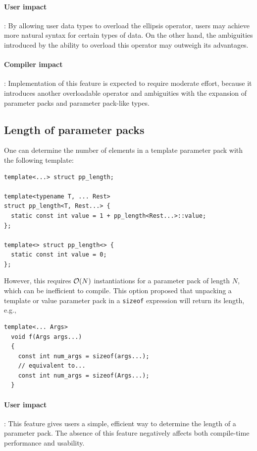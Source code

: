 \documentclass{article}
\begin{document}
\paragraph{User impact}: By allowing user data types to overload the
ellipsis operator, users may achieve more natural syntax for certain
types of data. On the other hand, the ambiguities introduced by the
ability to overload this operator may outweigh its advantages.

\paragraph{Compiler impact}: Implementation of this feature is expected to
require moderate effort, because it introduces another overloadable
operator and ambiguities with the expansion of parameter packs and
parameter pack-like types.

\subsection{Length of parameter packs}
\label{sec:pp-size}
One can determine the number of elements in a template parameter pack
with the following template:
\begin{verbatim}
template<...> struct pp_length;

template<typename T, ... Rest>
struct pp_length<T, Rest...> {
  static const int value = 1 + pp_length<Rest...>::value; 
};

template<> struct pp_length<> {
  static const int value = 0;
};
\end{verbatim}

However, this requires ${\cal O}(N)$ instantiations for a parameter
pack of length $N$, which can be inefficient to compile. This option
proposed that unpacking a template or value parameter pack in a
\texttt{sizeof} expression will return its length, e.g.,

\begin{verbatim}
template<... Args>
  void f(Args args...)
  {
    const int num_args = sizeof(args...);
    // equivalent to...
    const int num_args = sizeof(Args...);
  }
\end{verbatim}

\paragraph{User impact}: This feature gives users a simple, efficient
way to determine the length of a parameter pack. The absence of this
feature negatively affects both compile-time performance and usability.
\end{document}
